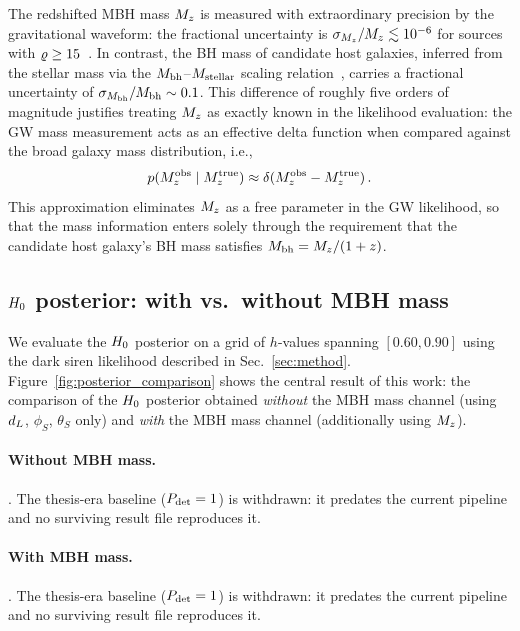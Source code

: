 The redshifted MBH mass $M_z$ is measured with extraordinary precision
by the gravitational waveform: the fractional uncertainty is
$\sigma_{M_z}/M_z \lesssim 10^{-6}$ for sources with
$\varrho \geq 15$~\cite{Babak:2017tow}. In contrast, the BH mass of
candidate host galaxies, inferred from the stellar mass via the
$M_\mathrm{bh}$--$M_\mathrm{stellar}$ scaling relation~\cite{Reines:2015moa}, carries a
fractional uncertainty of $\sigma_{M_\mathrm{bh}}/M_\mathrm{bh} \sim 0.1$. This
difference of roughly five orders of magnitude justifies treating
$M_z$ as exactly known in the likelihood evaluation: the GW mass
measurement acts as an effective delta function when compared against the
broad galaxy mass distribution, i.e.,
\begin{equation}
  p(M_z^\mathrm{obs} \mid M_z^\mathrm{true})
  \approx \delta(M_z^\mathrm{obs} - M_z^\mathrm{true}) \,.
  \label{eq:delta_mass}
\end{equation}
This approximation eliminates $M_z$ as a free parameter in the GW
likelihood, so that the mass information enters solely through the
requirement that the candidate host galaxy's BH mass satisfies
$M_\mathrm{bh} = M_z / (1+z)$.

\subsection{$H_0$ posterior: with vs.\ without MBH mass}
\label{sec:h0_posterior}

We evaluate the $H_0$ posterior on a grid of $h$-values spanning
$[0.60, 0.90]$ using the dark siren likelihood described in
Sec.~\ref{sec:method}. Figure~\ref{fig:posterior_comparison} shows the
central result of this work: the comparison of the $H_0$ posterior
obtained \emph{without} the MBH mass channel (using $d_L$, $\phi_S$,
$\theta_S$ only) and \emph{with} the MBH mass channel (additionally
using $M_z$).

\paragraph{Without MBH mass.}
. The
thesis-era baseline ($P_\mathrm{det} = 1$) is withdrawn: it predates the current
pipeline and no surviving result file reproduces it.

\paragraph{With MBH mass.}
. The
thesis-era baseline ($P_\mathrm{det} = 1$) is withdrawn: it predates the current
pipeline and no surviving result file reproduces it.

